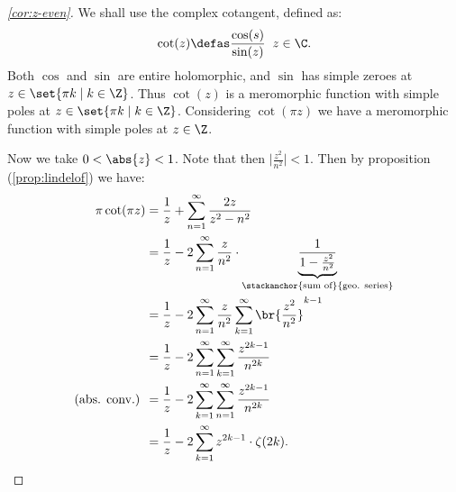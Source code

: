 \begin{proof}[\ref{cor:z-even}]
We shall use the complex cotangent, defined as:
\begin{align*}
    \cot(z) \defas \frac{\cos(s)}{ \sin(z)} \; \; z \in \C.
\end{align*}
Both $\cos$ and $\sin$ are entire holomorphic, and $\sin$ has simple zeroes at $z \in \set{\pi k \mid k \in \Z}$. Thus $\cot (z)$ is a meromorphic function with simple poles at $z \in \set{\pi k \mid k \in \Z}$. Considering $\cot(\pi z)$ we have a meromorphic function with simple poles at $z \in \Z$.

Now we take $0<\abs{z} < 1$. Note that then $\big|\frac{z^2}{n^2} \big| < 1$. Then by proposition (\ref{prop:lindelof}) we have:
\begin{align*}
    \pi \cot(\pi z) &= \frac{1}{z} + \sum_{n=1}^\infty \frac{2 z }{z^2-n^2}\\
    &= \frac{1}{z} - 2 \sum_{n=1}^\infty \frac{z }{n^2} \cdot \underbrace{\frac{1}{1-\frac{z^2}{n^2}}}_{\text{\stackanchor{sum of}{geo. series}}}\\
    &= \frac{1}{z} - 2 \sum_{n=1}^\infty \frac{z }{n^2}  \sum_{k=1}^\infty \br{\frac{z^2}{n^2}}^{k-1}\\
    &= \frac{1}{z} - 2 \sum_{n=1}^\infty \sum_{k=1}^\infty \frac{z^{2k-1}}{n^{2k}}\\
    \text{(abs. conv.) }&= \frac{1}{z} - 2 \sum_{k=1}^\infty \sum_{n=1}^\infty \frac{z^{2k-1}}{n^{2k}}\\
    &= \frac{1}{z} - 2 \sum_{k=1}^\infty z^{2k-1} \cdot \zeta(2k).
\end{align*}


\end{proof}
